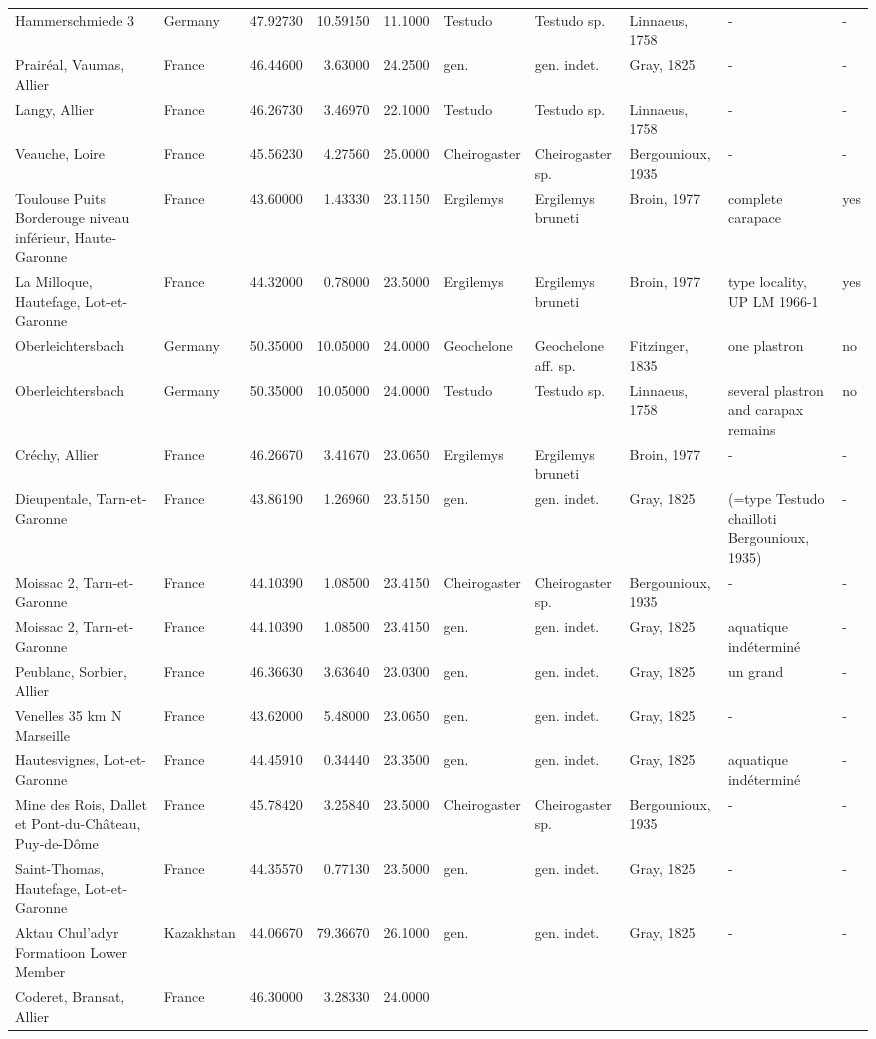 \begin{landscape}
{\begin{longtable}[]{@{}llrrrlllll@{}}
Hammerschmiede 3 & Germany & 47.92730 & 10.59150 & 11.1000 & Testudo &
Testudo sp. & Linnaeus, 1758 & - & -\tabularnewline
Prairéal, Vaumas, Allier & France & 46.44600 & 3.63000 & 24.2500 & gen.
& gen. indet. & Gray, 1825 & - & -\tabularnewline
Langy, Allier & France & 46.26730 & 3.46970 & 22.1000 & Testudo &
Testudo sp. & Linnaeus, 1758 & - & -\tabularnewline
Veauche, Loire & France & 45.56230 & 4.27560 & 25.0000 & Cheirogaster &
Cheirogaster sp. & Bergounioux, 1935 & - & -\tabularnewline
Toulouse Puits Borderouge niveau inférieur, Haute-Garonne & France &
43.60000 & 1.43330 & 23.1150 & Ergilemys & Ergilemys bruneti & Broin,
1977 & complete carapace & yes\tabularnewline
La Milloque, Hautefage, Lot-et-Garonne & France & 44.32000 & 0.78000 &
23.5000 & Ergilemys & Ergilemys bruneti & Broin, 1977 & type locality,
UP LM 1966-1 & yes\tabularnewline
Oberleichtersbach & Germany & 50.35000 & 10.05000 & 24.0000 & Geochelone
& Geochelone aff. sp. & Fitzinger, 1835 & one plastron &
no\tabularnewline
Oberleichtersbach & Germany & 50.35000 & 10.05000 & 24.0000 & Testudo &
Testudo sp. & Linnaeus, 1758 & several plastron and carapax remains &
no\tabularnewline
Créchy, Allier & France & 46.26670 & 3.41670 & 23.0650 & Ergilemys &
Ergilemys bruneti & Broin, 1977 & - & -\tabularnewline
Dieupentale, Tarn-et-Garonne & France & 43.86190 & 1.26960 & 23.5150 &
gen. & gen. indet. & Gray, 1825 & (=type Testudo chailloti Bergounioux,
1935) & -\tabularnewline
Moissac 2, Tarn-et-Garonne & France & 44.10390 & 1.08500 & 23.4150 &
Cheirogaster & Cheirogaster sp. & Bergounioux, 1935 & - &
-\tabularnewline
Moissac 2, Tarn-et-Garonne & France & 44.10390 & 1.08500 & 23.4150 &
gen. & gen. indet. & Gray, 1825 & aquatique indéterminé &
-\tabularnewline
Peublanc, Sorbier, Allier & France & 46.36630 & 3.63640 & 23.0300 & gen.
& gen. indet. & Gray, 1825 & un grand & -\tabularnewline
Venelles 35 km N Marseille & France & 43.62000 & 5.48000 & 23.0650 &
gen. & gen. indet. & Gray, 1825 & - & -\tabularnewline
Hautesvignes, Lot-et-Garonne & France & 44.45910 & 0.34440 & 23.3500 &
gen. & gen. indet. & Gray, 1825 & aquatique indéterminé &
-\tabularnewline
Mine des Rois, Dallet et Pont-du-Château, Puy-de-Dôme & France &
45.78420 & 3.25840 & 23.5000 & Cheirogaster & Cheirogaster sp. &
Bergounioux, 1935 & - & -\tabularnewline
Saint-Thomas, Hautefage, Lot-et-Garonne & France & 44.35570 & 0.77130 &
23.5000 & gen. & gen. indet. & Gray, 1825 & - & -\tabularnewline
Aktau Chul'adyr Formatioon Lower Member & Kazakhstan & 44.06670 &
79.36670 & 26.1000 & gen. & gen. indet. & Gray, 1825 & - &
-\tabularnewline
Coderet, Bransat, Allier & France & 46.30000 & 3.28330 & 24.0000 &

\end{longtable}}
\end{landscape}
